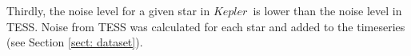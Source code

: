 \documentclass[a4paper,fleqn,usenatbib,useAMS]{mnras}
\newcommand{\kep}{\ensuremath{Kepler}\:}
\begin{document}

Thirdly, the noise level for a given star in \kep \ is lower than the noise level in TESS. %
Noise from TESS was calculated for each star and added to the timeseries (see Section \ref{sect: dataset}).
\end{document}
